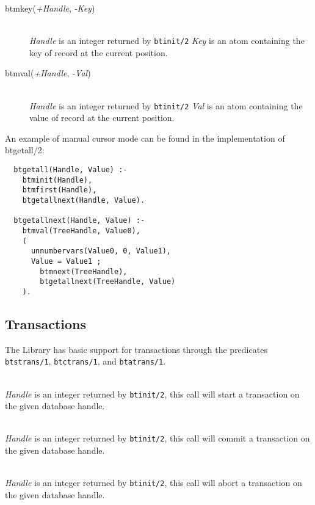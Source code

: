 \begin{description}

\item[btmkey({\it +Handle}, {\it -Key})]\mbox{}
  \\
    {\it Handle} is an integer returned by {\tt btinit/2}
    {\it Key} is an atom containing the key of record at the current position.

\item[btmval({\it +Handle}, {\it -Val})]\mbox{}
  \\
    {\it Handle} is an integer returned by {\tt btinit/2}
    {\it Val} is an atom containing the value of record at the current position.

\end{description}

An example of manual cursor mode can be found in the implementation of btgetall/2:

\begin{verbatim}
  btgetall(Handle, Value) :- 
    btminit(Handle),
    btmfirst(Handle),
    btgetallnext(Handle, Value).

  btgetallnext(Handle, Value) :- 
    btmval(TreeHandle, Value0),
    ( 
      unnumbervars(Value0, 0, Value1),
      Value = Value1 ; 
        btmnext(TreeHandle),
        btgetallnext(TreeHandle, Value)
    ).
\end{verbatim}

\subsection{Transactions}

The Library has basic support for transactions through the predicates {\tt btstrans/1}, {\tt btctrans/1}, and {\tt btatrans/1}.

\begin{description}

\item[btstrans({\it +Handle})]\mbox{}
  \\
    {\it Handle} is an integer returned by {\tt btinit/2}, this call will start a transaction on the given database handle.
\item[btctrans({\it +Handle})]\mbox{}
  \\
    {\it Handle} is an integer returned by {\tt btinit/2}, this call will commit a transaction on the given database handle.
\item[btatrans({\it +Handle})]\mbox{}
  \\
    {\it Handle} is an integer returned by {\tt btinit/2}, this call will abort a transaction on the given database handle.

\end{description}

